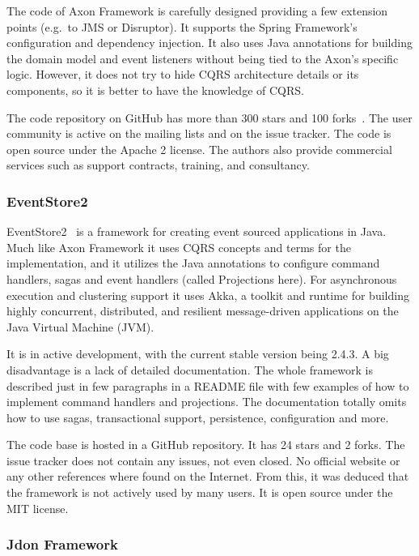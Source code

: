 \documentclass{book}
\begin{document}
The code of Axon Framework is carefully designed providing a few
extension points (e.g.~to JMS or Disruptor). It supports the Spring
Framework's configuration and dependency injection. It also uses Java
annotations for building the domain model and event listeners without
being tied to the Axon's specific logic. However, it does not try to
hide CQRS architecture details or its components, so it is better to
have the knowledge of CQRS.

The code repository on GitHub has more than 300 stars and 100 forks~\cite{axon-repo}. The user community is active on the mailing lists and
on the issue tracker. The code is open source under the Apache 2
license. The authors also provide commercial services such as support
contracts, training, and consultancy.

\subsubsection{EventStore2}\label{eventstore2}

EventStore2~\cite{eventstore2} is a framework for creating event sourced
applications in Java. Much like Axon Framework it uses CQRS concepts and
terms for the implementation, and it utilizes the Java annotations to
configure command handlers, sagas and event handlers (called Projections
here). For asynchronous execution and clustering support it uses Akka, a
toolkit and runtime for building highly concurrent, distributed, and
resilient message-driven applications on the Java Virtual Machine (JVM).

It is in active development, with the current stable version being
2.4.3. A big disadvantage is a lack of detailed documentation. The whole
framework is described just in few paragraphs in a README file with few
examples of how to implement command handlers and projections. The
documentation totally omits how to use sagas, transactional support,
persistence, configuration and more.

The code base is hosted in a GitHub repository. It has 24 stars and 2
forks. The issue tracker does not contain any issues, not even closed.
No official website or any other references where found on the Internet.
From this, it was deduced that the framework is not actively used by
many users. It is open source under the MIT license.

\subsubsection{Jdon Framework}\label{jdon-framework}
\end{document}
